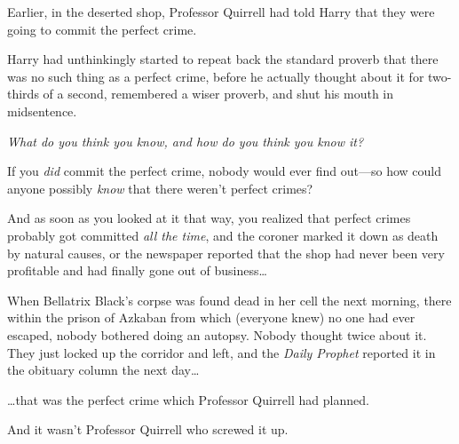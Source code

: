 \later

Earlier, in the deserted shop, Professor Quirrell had told Harry that they were going to commit the perfect crime.

Harry had unthinkingly started to repeat back the standard proverb that there was no such thing as a perfect crime, before he actually thought about it for two-thirds of a second, remembered a wiser proverb, and shut his mouth in midsentence.

\emph{What do you think you know, and how do you think you know it?}

If you \emph{did} commit the perfect crime, nobody would ever find out—so how could anyone possibly \emph{know} that there weren’t perfect crimes?

And as soon as you looked at it that way, you realized that perfect crimes probably got committed \emph{all the time}, and the coroner marked it down as death by natural causes, or the newspaper reported that the shop had never been very profitable and had finally gone out of business…

When Bellatrix Black’s corpse was found dead in her cell the next morning, there within the prison of Azkaban from which (everyone knew) no one had ever escaped, nobody bothered doing an autopsy. Nobody thought twice about it. They just locked up the corridor and left, and the \emph{Daily Prophet} reported it in the obituary column the next day…

…that was the perfect crime which Professor Quirrell had planned.

And it wasn’t Professor Quirrell who screwed it up.
